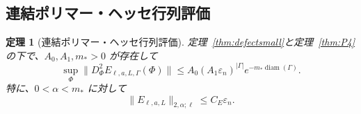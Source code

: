 \documentclass[12pt]{article}
\theoremstyle{plain}
\newtheorem{theorem}{定理}[section]
\theoremstyle{definition}
\numberwithin{equation}{section}
\newcommand{\diam}{\operatorname{diam}}
\begin{document}
\subsection{連結ポリマー・ヘッセ行列評価}

\begin{theorem}[連結ポリマー・ヘッセ行列評価]\label{thm:polymerHessian}
定理~\ref{thm:defectsmall}と定理~\ref{thm:P4}の下で、$A_0,A_1,m_*>0$ が存在して
\begin{equation}
\sup_\Phi\|D_\Phi^2 E_{\ell,a,L,\Gamma}(\Phi)\| \leq A_0(A_1\varepsilon_n)^{|\Gamma|}e^{-m_*\diam(\Gamma)}.
\end{equation}
特に、$0<\alpha<m_*$ に対して
\begin{equation}
\boxed{\|E_{\ell,a,L}\|_{2,\alpha;\ell} \leq C_E\varepsilon_n.}
\end{equation}
\end{theorem}
\end{document}
